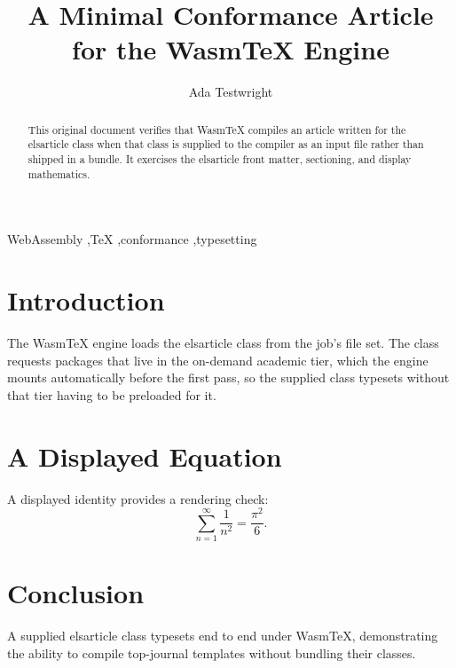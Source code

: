 \documentclass[preprint,12pt]{elsarticle}
\begin{document}
\begin{frontmatter}

\title{A Minimal Conformance Article for the WasmTeX Engine}

\author{Ada Testwright}
\address{WasmTeX Conformance Corpus}

\begin{abstract}
This original document verifies that WasmTeX compiles an article written for the
elsarticle class when that class is supplied to the compiler as an input file
rather than shipped in a bundle. It exercises the elsarticle front matter,
sectioning, and display mathematics.
\end{abstract}

\begin{keyword}
WebAssembly \sep TeX \sep conformance \sep typesetting
\end{keyword}

\end{frontmatter}

\section{Introduction}
The WasmTeX engine loads the elsarticle class from the job's file set. The
class requests packages that live in the on-demand academic tier, which the
engine mounts automatically before the first pass, so the supplied class
typesets without that tier having to be preloaded for it.

\section{A Displayed Equation}
A displayed identity provides a rendering check:
\begin{equation}
\sum_{n=1}^{\infty} \frac{1}{n^{2}} = \frac{\pi^{2}}{6}.
\end{equation}

\section{Conclusion}
A supplied elsarticle class typesets end to end under WasmTeX, demonstrating the
ability to compile top-journal templates without bundling their classes.
\end{document}
